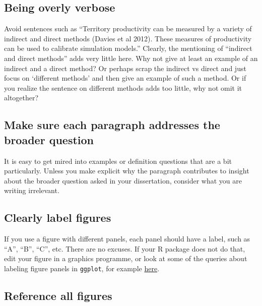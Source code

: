 \documentclass[
]{book}
\begin{document}
\hypertarget{being-overly-verbose}{%
\subsection{Being overly verbose}\label{being-overly-verbose}}

Avoid sentences such as ``Territory productivity can be measured by a variety of
indirect and direct methods (Davies et al 2012). These measures of productivity
can be used to calibrate simulation models.'' Clearly, the mentioning of
``indirect and direct methods'' adds very little here. Why not give at least an
example of an indirect and a direct method? Or perhaps scrap the indirect vs direct and
just focus on `different methods' and then give an example of such a method.
Or if you realize the sentence on different methods adds too little, why not omit it altogether?

\hypertarget{make-sure-each-paragraph-addresses-the-broader-question}{%
\subsection{Make sure each paragraph addresses the broader question}\label{make-sure-each-paragraph-addresses-the-broader-question}}

It is easy to get mired into examples or definition questions that are a bit particularly. Unless you
make explicit why the paragraph contributes to insight about the broader question
asked in your dissertation, consider what you are writing irrelevant.

\hypertarget{clearly-label-figures}{%
\subsection{Clearly label figures}\label{clearly-label-figures}}

If you use a figure with different panels, each panel should have a label, such
as ``A'', ``B'', ``C'', etc. There are no excuses. If your R package does not do that,
edit your figure in a graphics programme, or look at some of the queries about
labeling figure panels in \texttt{ggplot}, for example \href{https://stackoverflow.com/questions/17576381/label-individual-panels-in-a-multi-panel-ggplot2}{here}.

\hypertarget{reference-all-figures}{%
\subsection{Reference all figures}\label{reference-all-figures}}
\end{document}
